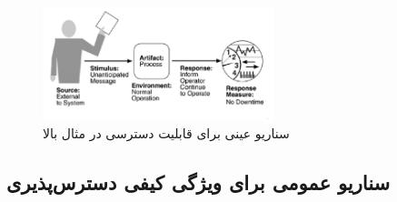 \begin{figure}[H]
    \centering
    \includegraphics[width=0.6\textwidth]{images/heartbeat-system-concrete-scenario.png}
    \caption{سناریو عینی برای قابلیت دسترسی در مثال بالا}
    \label{fig:heartbeatExampleConcreteScenrario}
\end{figure}

\subsection{سناریو عمومی برای ویژگی کیفی دسترس‌پذیری}

